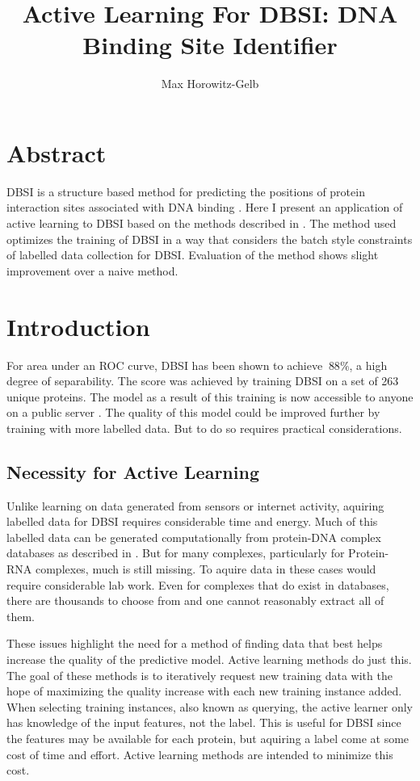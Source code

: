 \documentclass{article}
\begin{document}
\author{Max Horowitz-Gelb}
\title{Active Learning For DBSI: DNA Binding Site Identifier }
\maketitle

\section*{Abstract}
DBSI is a structure based method for predicting the positions of protein interaction sites associated with DNA binding \cite{dbsi}. Here I present an application of active learning to DBSI based on the methods described in \cite{active_learning}. The method used optimizes the training of DBSI in a way that considers the batch style constraints of labelled data collection for DBSI. Evaluation of the method shows slight improvement over a naive method.
\section*{Introduction}
For area under an ROC curve, DBSI has been shown to achieve $~88\%$, a high degree of separability. The score was achieved by training DBSI on a set of 263 unique proteins. The model as a result of this training is now accessible to anyone on a public server \cite{dbsi_server}. The quality of this model could be improved further by training with more labelled data. But to do so requires practical considerations.
\subsection*{Necessity for Active Learning}
Unlike learning on data generated from sensors or internet activity, aquiring labelled data for DBSI requires considerable time and energy. Much of this labelled data can be generated computationally from protein-DNA complex databases as described in \cite{displar}.
But for many complexes, particularly for Protein-RNA complexes, much is still missing. To aquire data in these cases would require considerable lab work. Even for complexes that do exist in databases, there are thousands to choose from and one cannot reasonably extract all of them. 

These issues highlight the need for a method of finding data that best helps increase the quality of the predictive model. Active learning methods do just this. The goal of these methods is to iteratively request new training data with the hope of maximizing the quality increase with each new training instance added. When selecting training instances, also known as querying, the active learner only has knowledge of the input features, not the label. This is useful for DBSI since the features may be available for each protein, but aquiring a label come at some cost of time and effort. Active learning methods are intended to minimize this cost.
\end{document}
